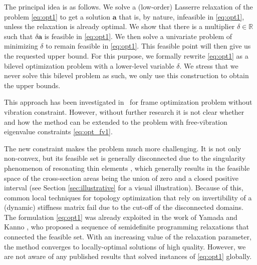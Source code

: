 \documentclass[final,onefignum,onetabnum]{siamart220329}
\begin{document}
The principal idea is as follows. We solve a (low-order) Lasserre relaxation of the problem \eqref{eq:opt1} to get a solution $\mathbf{a}$ that is, by nature, infeasible in \eqref{eq:opt1}, unless the relaxation is already optimal. We show that there is a multiplier $\delta\in\mathbb{R}$ such that $\delta\mathbf{a}$ is feasible in \eqref{eq:opt1}. We then solve a univariate problem of minimizing $\delta$ to remain feasible in \eqref{eq:opt1}. This feasible point will then give us the requested upper bound. For this purpose, we formally rewrite \eqref{eq:opt1} as a bilevel optimization problem with a lower-level variable $\delta$. We stress that we never solve this bilevel problem as such, we only use this construction to obtain the upper bounds.

This approach has been investigated in~\cite{Tyburec2023} for frame optimization problem without vibration constraint. {However, without further research it is not clear whether and how the method can be extended to the problem with free-vibration eigenvalue constraints \eqref{eq:opt_fv1}.} 

The new constraint makes the problem much more challenging. It is not only non-convex, but its feasible set is generally disconnected due to the singularity phenomenon of resonating thin elements \cite{Ni2014}, which generally results in the feasible space of the cross-section areas being the union of zero and a closed positive interval (see Section \ref{sec:illustrative} for a visual illustration). Because of this, common local techniques for topology optimization that rely on invertibility of a (dynamic) stiffness matrix fail due to the cut-off of the disconnected domains. %
The formulation \eqref{eq:opt1} was already exploited in the work of Yamada and Kanno \cite{Yamada2015}, who proposed a sequence of semidefinite programming relaxations that connected the feasible set. With an increasing value of the relaxation parameter, the method converges to locally-optimal solutions of high quality. However, we are not aware of any published results that solved {instances of \eqref{eq:opt1}} globally.
\end{document}
